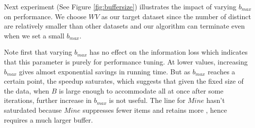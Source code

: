 Next experiment (See Figure \ref{fig:buffersize}) illustrates the impact of varying $b_{max}$ on performance.
We choose $WV$ as our target dataset since the number of
distinct \qids are relatively smaller than other datasets and our algorithm
can terminate even when we set a small $b_{max}$.

Note first that varying $b_{max}$ has no effect on the information loss which
indicates that this parameter is purely for performance tuning.
At lower values, increasing $b_{max}$ gives almost exponential
savings in running time. But as $b_{max}$ reaches a certain point, the speedup
saturates, which suggests that given the fixed size of the data,
when $B$ is large enough to accommodate all \qids at once after some iterations,
further increase in $b_{max}$ is not useful.
The line for $Mine$ hasn't saturdated because $Mine$ suppresses 
fewer items and retains more \qids, hence requires a much larger
buffer. 

